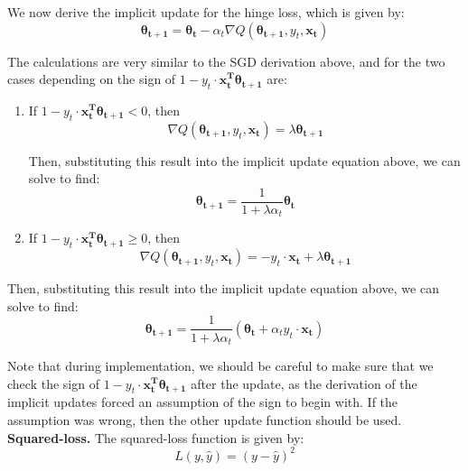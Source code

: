 \documentclass{article}
\renewcommand{\vec}[1]{\boldsymbol{#1}}
\begin{document}
\begin{enumerate}[(a)]
We now derive the implicit update for the hinge loss, which is given by:
\begin{equation}
\vec{\theta_{t+1}} = \vec{\theta_{t}} - \alpha_{t}\nabla Q(\vec{\theta_{t+1}}, y_t, \vec{x_t})
\end{equation}

The calculations are very similar to the SGD derivation above, and for the two cases depending on the sign of $1-y_t\cdot\vec{x_t^{T}}\vec{\theta_{t+1}}$ are:

\begin{enumerate}[1.]
\item If $1-y_t\cdot\vec{x_t^{T}}\vec{\theta_{t+1}} < 0$, then
\begin{equation*}
\nabla Q(\vec{\theta_{t+1}}, y_t, \vec{x_t}) = \lambda\vec{\theta_{t+1}}
\end{equation*}

Then, substituting this result into the implicit update equation above, we can solve to find:
\begin{equation}
\vec{\theta_{t+1}} = \frac{1}{1+\lambda\alpha_t}\vec{\theta_t}
\end{equation}

\item If $1-y_t\cdot\vec{x_t^{T}}\vec{\theta_{t+1}} \geq 0$, then 
\begin{equation*}
\nabla Q(\vec{\theta_{t+1}}, y_t, \vec{x_t}) = -y_t\cdot\vec{x_t} + \lambda\vec{\theta_{t+1}}
\end{equation*}
\end{enumerate}

Then, substituting this result into the implicit update equation above, we can solve to find:
\begin{equation}
\vec{\theta_{t+1}} = \frac{1}{1+\lambda\alpha_t}\left(\vec{\theta_t} + \alpha_t y_t\cdot\vec{x_t}\right)
\end{equation}

Note that during implementation, we should be careful to make sure that we check the sign of $1-y_t\cdot\vec{x_t^{T}}\vec{\theta_{t+1}}$ after the update, as the derivation of the implicit updates forced an assumption of the sign to begin with. If the assumption was wrong, then the other update function should be used.\\

\textbf{Squared-loss.}
The squared-loss function is given by:
\begin{equation}
L(y, \hat{y}) = (y-\hat{y})^2
\end{equation}


\end{enumerate}
\end{document}
